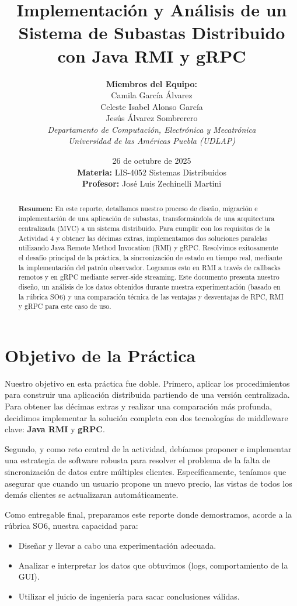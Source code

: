 \documentclass[11pt, a4paper]{article}
\title{Implementación y Análisis de un Sistema de Subastas Distribuido con Java RMI y gRPC}
\author{
  \textbf{Miembros del Equipo:}\\
  Camila García Álvarez\\
  Celeste Isabel Alonso García\\
  Jesús Álvarez Sombrerero
  \vspace{1em} \\
  \textit{Departamento de Computación, Electrónica y Mecatrónica}\\
  \textit{Universidad de las Américas Puebla (UDLAP)}
}
\date{26 de octubre de 2025 \\ \vspace{1em}
   \textbf{Materia:} LIS-4052 Sistemas Distribuidos \\
    \textbf{Profesor:} José Luis Zechinelli Martini
}
\begin{document}
\maketitle
\thispagestyle{empty} %

\begin{abstract}
\textbf{Resumen:} En este reporte, detallamos nuestro proceso de diseño, migración e implementación de una aplicación de subastas, transformándola de una arquitectura centralizada (MVC) a un sistema distribuido.
Para cumplir con los requisitos de la Actividad 4 y obtener las décimas extras, implementamos dos soluciones paralelas utilizando Java Remote Method Invocation (RMI) y gRPC.
Resolvimos exitosamente el desafío principal de la práctica, la sincronización de estado en tiempo real, mediante la implementación del patrón observador.
Logramos esto en RMI a través de callbacks remotos y en gRPC mediante server-side streaming.
Este documento presenta nuestro diseño, un análisis de los datos obtenidos durante nuestra experimentación (basado en la rúbrica SO6) y una comparación técnica de las ventajas y desventajas de RPC, RMI y gRPC para este caso de uso.
\end{abstract}

\newpage
\tableofcontents %
\newpage

\section{Objetivo de la Práctica}
\label{sec:objetivo}

Nuestro objetivo en esta práctica fue doble.
Primero, aplicar los procedimientos para construir una aplicación distribuida partiendo de una versión centralizada. Para obtener las décimas extras y realizar una comparación más profunda, decidimos implementar la solución completa con dos tecnologías de middleware clave: \textbf{Java RMI} y \textbf{gRPC}.

Segundo, y como reto central de la actividad, debíamos proponer e implementar una estrategia de software robusta para resolver el problema de la falta de sincronización de datos entre múltiples clientes.
Específicamente, teníamos que asegurar que cuando un usuario propone un nuevo precio, las vistas de todos los demás clientes se actualizaran automáticamente.

Como entregable final, preparamos este reporte donde demostramos, acorde a la rúbrica SO6, nuestra capacidad para:
\begin{itemize}
    \item Diseñar y llevar a cabo una experimentación adecuada.
\item Analizar e interpretar los datos que obtuvimos (logs, comportamiento de la GUI).
\item Utilizar el juicio de ingeniería para sacar conclusiones válidas.
\end{itemize}
\end{document}
